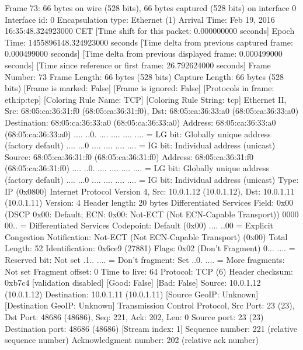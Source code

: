 Frame 73: 66 bytes on wire (528 bits), 66 bytes captured (528 bits) on interface 0
    Interface id: 0
    Encapsulation type: Ethernet (1)
    Arrival Time: Feb 19, 2016 16:35:48.324923000 CET
    [Time shift for this packet: 0.000000000 seconds]
    Epoch Time: 1455896148.324923000 seconds
    [Time delta from previous captured frame: 0.000499000 seconds]
    [Time delta from previous displayed frame: 0.000499000 seconds]
    [Time since reference or first frame: 26.792624000 seconds]
    Frame Number: 73
    Frame Length: 66 bytes (528 bits)
    Capture Length: 66 bytes (528 bits)
    [Frame is marked: False]
    [Frame is ignored: False]
    [Protocols in frame: eth:ip:tcp]
    [Coloring Rule Name: TCP]
    [Coloring Rule String: tcp]
Ethernet II, Src: 68:05:ca:36:31:f0 (68:05:ca:36:31:f0), Dst: 68:05:ca:36:33:a0 (68:05:ca:36:33:a0)
    Destination: 68:05:ca:36:33:a0 (68:05:ca:36:33:a0)
        Address: 68:05:ca:36:33:a0 (68:05:ca:36:33:a0)
        .... ..0. .... .... .... .... = LG bit: Globally unique address (factory default)
        .... ...0 .... .... .... .... = IG bit: Individual address (unicast)
    Source: 68:05:ca:36:31:f0 (68:05:ca:36:31:f0)
        Address: 68:05:ca:36:31:f0 (68:05:ca:36:31:f0)
        .... ..0. .... .... .... .... = LG bit: Globally unique address (factory default)
        .... ...0 .... .... .... .... = IG bit: Individual address (unicast)
    Type: IP (0x0800)
Internet Protocol Version 4, Src: 10.0.1.12 (10.0.1.12), Dst: 10.0.1.11 (10.0.1.11)
    Version: 4
    Header length: 20 bytes
    Differentiated Services Field: 0x00 (DSCP 0x00: Default; ECN: 0x00: Not-ECT (Not ECN-Capable Transport))
        0000 00.. = Differentiated Services Codepoint: Default (0x00)
        .... ..00 = Explicit Congestion Notification: Not-ECT (Not ECN-Capable Transport) (0x00)
    Total Length: 52
    Identification: 0x6ce9 (27881)
    Flags: 0x02 (Don't Fragment)
        0... .... = Reserved bit: Not set
        .1.. .... = Don't fragment: Set
        ..0. .... = More fragments: Not set
    Fragment offset: 0
    Time to live: 64
    Protocol: TCP (6)
    Header checksum: 0xb7c4 [validation disabled]
        [Good: False]
        [Bad: False]
    Source: 10.0.1.12 (10.0.1.12)
    Destination: 10.0.1.11 (10.0.1.11)
    [Source GeoIP: Unknown]
    [Destination GeoIP: Unknown]
Transmission Control Protocol, Src Port: 23 (23), Dst Port: 48686 (48686), Seq: 221, Ack: 202, Len: 0
    Source port: 23 (23)
    Destination port: 48686 (48686)
    [Stream index: 1]
    Sequence number: 221    (relative sequence number)
    Acknowledgment number: 202    (relative ack number)
